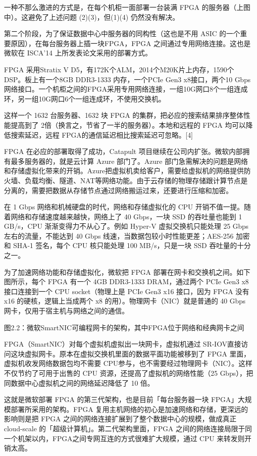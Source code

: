一种不那么激进的方式是，在每个机柜一面部署一台装满 FPGA 的服务器（上图中）。这避免了上述问题 (2)(3)，但(1)(4) 仍然没有解决。

第二个阶段，为了保证数据中心中服务器的同构性（这也是不用 ASIC 的一个重要原因），在每台服务器上插一块FPGA，FPGA 之间通过专用网络连接。这也是微软在 ISCA’14 上所发表论文采用的部署方式。

FPGA 采用Stratix V D5，有172K个ALM，2014个M20K片上内存，1590个 DSP。板上有一个8GB DDR3-1333 内存，一个PCIe Gen3 x8接口，两个10 Gbps网络接口。一个机柜之间的FPGA采用专用网络连接，一组10G网口8个一组连成环，另一组10G网口6个一组连成环，不使用交换机。

这样一个 1632 台服务器、1632 块 FPGA 的集群，把必应的搜索结果排序整体性能提高到了 2倍（换言之，节省了一半的服务器）。本地和远程的 FPGA 均可以降低搜索延迟，远程 FPGA的通信延迟相比搜索延迟可忽略。[4]

FPGA 在必应的部署取得了成功，Catapult 项目继续在公司内扩张。微软内部拥有最多服务器的，就是云计算 Azure 部门了。Azure 部门急需解决的问题是网络和存储虚拟化带来的开销。Azure把虚拟机卖给客户，需要给虚拟机的网络提供防火墙、负载均衡、隧道、NAT等网络功能。由于云存储的物理存储跟计算节点是分离的，需要把数据从存储节点通过网络搬运过来，还要进行压缩和加密。

在 1 Gbps 网络和机械硬盘的时代，网络和存储虚拟化的 CPU 开销不值一提。随着网络和存储速度越来越快，网络上了 40 Gbps，一块 SSD 的吞吐量也能到 1 GB/s，CPU 渐渐变得力不从心了。例如 Hyper-V 虚拟交换机只能处理 25 Gbps 左右的流量，不能达到 40 Gbps 线速，当数据包较小时性能更差；AES-256 加密和 SHA-1 签名，每个 CPU 核只能处理 100 MB/s，只是一块 SSD 吞吐量的十分之一。

为了加速网络功能和存储虚拟化，微软把 FPGA 部署在网卡和交换机之间。如下图所示，每个 FPGA 有一个 4GB DDR3-1333 DRAM，通过两个 PCIe Gen3 x8 接口连接到一个 CPU socket（物理上是 PCIe Gen3 x16 接口，因为 FPGA 没有 x16 的硬核，逻辑上当成两个 x8 的用）。物理网卡（NIC）就是普通的 40 Gbps 网卡，仅用于宿主机与网络之间的通信。


图2.2：微软SmartNIC可编程网卡的架构，其中FPGA位于网络和经典网卡之间

FPGA（SmartNIC）对每个虚拟机虚拟出一块网卡，虚拟机通过 SR-IOV直接访问这块虚拟网卡。原本在虚拟交换机里面的数据平面功能被移到了 FPGA 里面，虚拟机收发网络数据包均不需要 CPU参与，也不需要经过物理网卡（NIC）。这样不仅节约了可用于出售的 CPU 资源，还提高了虚拟机的网络性能（25 Gbps），把同数据中心虚拟机之间的网络延迟降低了 10 倍。

这就是微软部署 FPGA 的第三代架构，也是目前「每台服务器一块 FPGA」大规模部署所采用的架构。FPGA 复用主机网络的初心是加速网络和存储，更深远的影响则是把 FPGA 之间的网络连接扩展到了整个数据中心的规模，做成真正 cloud-scale 的「超级计算机」。第二代架构里面，FPGA 之间的网络连接局限于同一个机架以内，FPGA之间专网互连的方式很难扩大规模，通过 CPU 来转发则开销太高。

